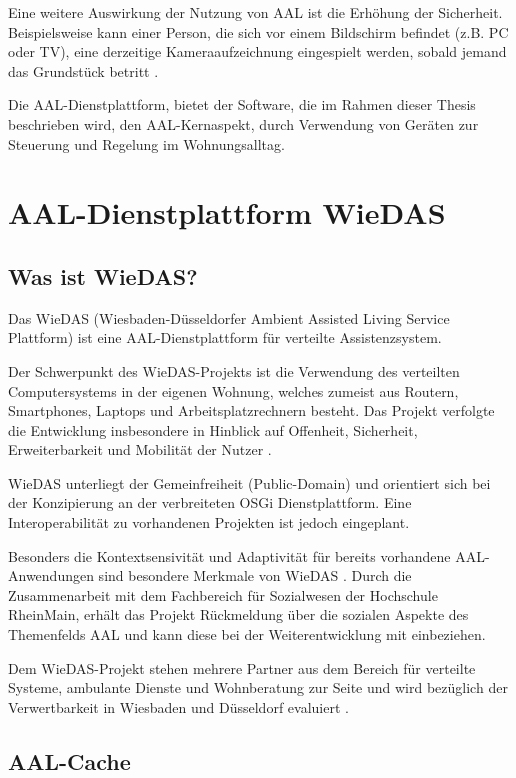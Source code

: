 Eine weitere Auswirkung der Nutzung von AAL ist die Erhöhung der Sicherheit.
Beispielsweise kann einer Person, die sich vor einem Bildschirm befindet (z.B. PC oder TV),
eine derzeitige Kameraaufzeichnung eingespielt werden, sobald jemand das Grundstück betritt \cite{crestron}.

Die AAL-Dienstplattform, bietet der Software, die im Rahmen dieser Thesis beschrieben wird, den AAL-Kernaspekt,
durch Verwendung von Geräten zur Steuerung und Regelung im Wohnungsalltag.

\section{AAL-Dienstplattform WieDAS}

\subsection{Was ist WieDAS?}

Das WieDAS (Wiesbaden-Düsseldorfer Ambient Assisted Living Service Plattform) ist eine AAL-Dienstplattform
für verteilte Assistenzsystem.

Der Schwerpunkt des WieDAS-Projekts ist die Verwendung des verteilten Computersystems in der eigenen Wohnung,
welches zumeist aus Routern, Smartphones, Laptops und Arbeitsplatzrechnern besteht.
Das Projekt verfolgte die Entwicklung insbesondere in Hinblick auf Offenheit, Sicherheit, Erweiterbarkeit
und Mobilität der Nutzer \cite{wiedas}.

WieDAS unterliegt der Gemeinfreiheit (Public-Domain) und orientiert sich bei der Konzipierung an der
verbreiteten OSGi Dienstplattform.
Eine Interoperabilität zu vorhandenen Projekten ist jedoch eingeplant.

Besonders die Kontextsensivität und Adaptivität für bereits vorhandene AAL-Anwendungen sind besondere
Merkmale von WieDAS \cite{wiedas}.
Durch die Zusammenarbeit mit dem Fachbereich für Sozialwesen der Hochschule RheinMain, erhält das Projekt
Rückmeldung über die sozialen Aspekte des Themenfelds AAL und kann diese bei der Weiterentwicklung mit
einbeziehen.

Dem WieDAS-Projekt stehen mehrere Partner aus dem Bereich für verteilte Systeme, ambulante Dienste und
Wohnberatung zur Seite und wird bezüglich der Verwertbarkeit in Wiesbaden und Düsseldorf evaluiert \cite{wiedas}.

\subsection{AAL-Cache}


